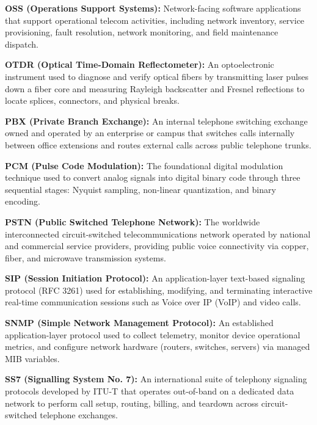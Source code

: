 \documentclass[12pt,a4paper]{report}
\begin{document}
\vspace{0.2cm}
\noindent\textbf{OSS (Operations Support Systems):} Network-facing software applications that support operational telecom activities, including network inventory, service provisioning, fault resolution, network monitoring, and field maintenance dispatch.

\vspace{0.2cm}
\noindent\textbf{OTDR (Optical Time-Domain Reflectometer):} An optoelectronic instrument used to diagnose and verify optical fibers by transmitting laser pulses down a fiber core and measuring Rayleigh backscatter and Fresnel reflections to locate splices, connectors, and physical breaks.

\vspace{0.2cm}
\noindent\textbf{PBX (Private Branch Exchange):} An internal telephone switching exchange owned and operated by an enterprise or campus that switches calls internally between office extensions and routes external calls across public telephone trunks.

\vspace{0.2cm}
\noindent\textbf{PCM (Pulse Code Modulation):} The foundational digital modulation technique used to convert analog signals into digital binary code through three sequential stages: Nyquist sampling, non-linear quantization, and binary encoding.

\vspace{0.2cm}
\noindent\textbf{PSTN (Public Switched Telephone Network):} The worldwide interconnected circuit-switched telecommunications network operated by national and commercial service providers, providing public voice connectivity via copper, fiber, and microwave transmission systems.

\vspace{0.2cm}
\noindent\textbf{SIP (Session Initiation Protocol):} An application-layer text-based signaling protocol (RFC 3261) used for establishing, modifying, and terminating interactive real-time communication sessions such as Voice over IP (VoIP) and video calls.

\vspace{0.2cm}
\noindent\textbf{SNMP (Simple Network Management Protocol):} An established application-layer protocol used to collect telemetry, monitor device operational metrics, and configure network hardware (routers, switches, servers) via managed MIB variables.

\vspace{0.2cm}
\noindent\textbf{SS7 (Signalling System No. 7):} An international suite of telephony signaling protocols developed by ITU-T that operates out-of-band on a dedicated data network to perform call setup, routing, billing, and teardown across circuit-switched telephone exchanges.
\end{document}
